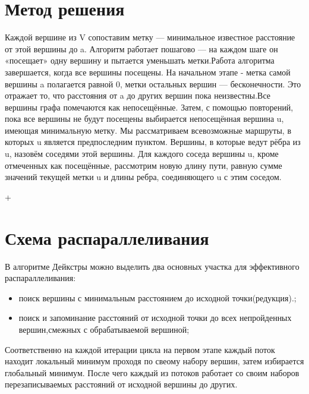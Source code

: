 \documentclass{report}
\begin{document}
\section*{Метод решения}
Каждой вершине из V сопоставим метку — минимальное известное расстояние от этой вершины до a.
Алгоритм работает пошагово — на каждом шаге он «посещает» одну вершину и пытается уменьшать метки.Работа алгоритма завершается, когда все вершины посещены.
На начальном этапе - метка самой вершины a полагается равной 0, метки остальных вершин — бесконечности.
Это отражает то, что расстояния от a до других вершин пока неизвестны.Все вершины графа помечаются как непосещённые.
Затем, с помощью повторений, пока все вершины не будут посещены выбирается непосещённая вершина u, имеющая минимальную метку.
Мы рассматриваем всевозможные маршруты, в которых u является предпоследним пунктом. Вершины, в которые ведут рёбра из u, назовём соседями этой вершины.
Для каждого соседа вершины u, кроме отмеченных как посещённые, рассмотрим новую длину пути, равную сумме значений текущей метки u и длины ребра, соединяющего u с этим соседом.
\newpage

+\section*{Схема распараллеливания}
В алгоритме Дейкстры можно выделить два основных участка для эффективного распараллеливания:
\begin{itemize}
\item поиск вершины с минимальным расстоянием до исходной точки(редукция).;
\item поиск и запоминание расстояний от исходной точки до всех непройденных вершин,смежных с обрабатываемой вершиной;
\end{itemize}
\par Соответственно на каждой итерации цикла на первом этапе каждый поток находит локальный минимум проходя по свеому набору вершин, затем избирается глобальный минимум.
После чего каждый из потоков работает со своим наборов перезаписываемых расстояний от исходной вершины до других.
\newpage
\end{document}
